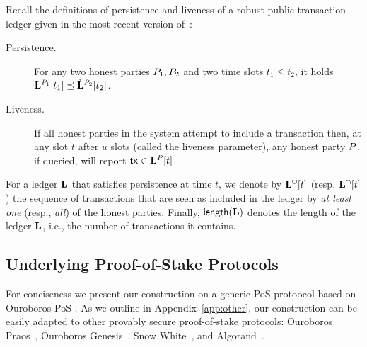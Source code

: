 Recall the definitions of persistence and liveness of a robust public
transaction ledger given in the most recent version of~\cite{EC:GarKiaLeo15}:

\begin{description}
  \item[Persistence.]
    For any two honest parties $P_1,P_2$ and two time slots $t_1\leq t_2$,
    it holds  $\mathbf{L}^{P_1}[t_1] \preceq
    \check{\mathbf{L}}^{P_2}[t_2]$.

  \item[Liveness.]
    If all honest parties in the system attempt to include a  transaction
    then, at any slot $t$ after $u$ slots (called the
    liveness parameter), any honest party $P$, if queried,
    will report $\mathsf{tx} \in \mathbf{L}^{P}[t]$.
\end{description}

For a ledger $\mathbf{L}$ that satisfies persistence at time $t$, we denote by $\mathbf{L}^{\cup}[t]$ (resp.
$\mathbf{L}^{\cap}[t]$) the sequence of transactions that are seen as
included in the ledger by \emph{at least one} (resp., \emph{all}) of the honest
parties. Finally, $\mathsf{length}(\mathbf{L})$ denotes the length of the ledger $\mathbf{L}$,
i.e., the number of transactions it contains.


\subsection{Underlying Proof-of-Stake Protocols}
\label{sec:ouroboros}
\label{sec:pos}

For conciseness we present our construction on a generic PoS protoocol
 based on  Ouroboros PoS \cite{C:KRDO17}. As we outline
in Appendix~\ref{app:other}, our construction can  be easily adapted to other
provably secure proof-of-stake protocols: Ouroboros
Praos~\cite{EC:DGKR18}, Ouroboros Genesis~\cite{genesis}, Snow
White~\cite{DBLP:journals/iacr/BentovPS16a}, and Algorand~\cite{algorand}.
